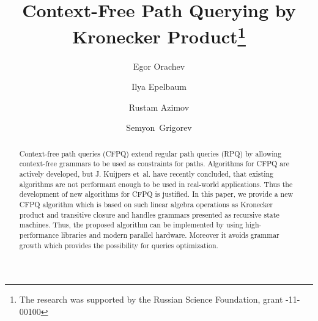 \documentclass[runningheads,table]{llncs}
\begin{document}
%
\title{Context-Free Path Querying by Kronecker Product\thanks{The research was supported by the Russian Science Foundation, grant -11-00100}}
%
%
\author{Egor Orachev \and
Ilya Epelbaum \and
Rustam Azimov \and
Semyon~Grigorev}
%
%
%
\maketitle              %
%
\begin{abstract}
Context-free path queries (CFPQ) extend regular path queries (RPQ) by allowing context-free grammars to be used as constraints for paths.
Algorithms for CFPQ are actively developed, but J. Kuijpers et~al. have recently concluded, that existing algorithms are not performant enough to be used in real-world applications.
Thus the development of new algorithms for CFPQ is justified.
In this paper, we provide a new CFPQ algorithm which is based on such linear algebra operations as Kronecker product and transitive closure and handles grammars presented as recursive state machines.
Thus, the proposed algorithm can be implemented by using high-performance libraries and modern parallel hardware.
Moreover it avoids grammar growth which provides the possibility for queries optimization.


\end{abstract}
%
%
%







%
%
%
 
 
\end{document}
